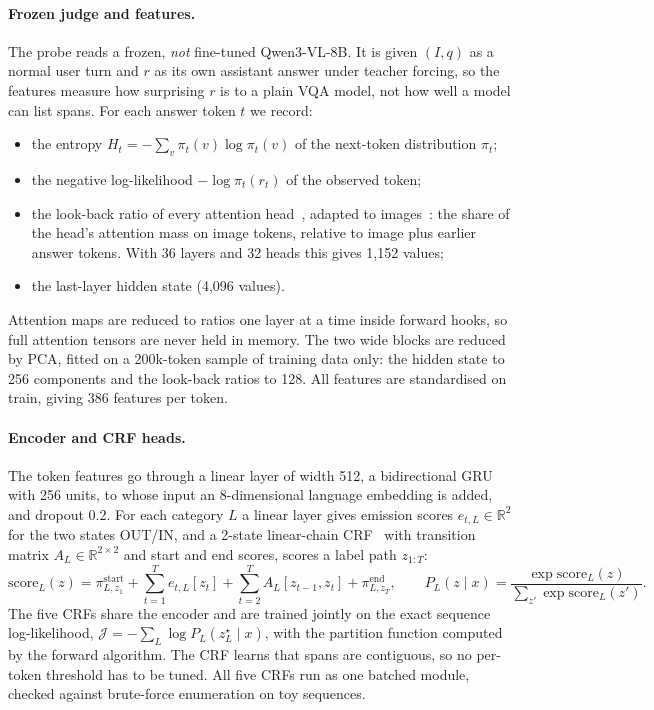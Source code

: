 \paragraph{Frozen judge and features.}
The probe reads a frozen, \emph{not} fine-tuned Qwen3-VL-8B. It is given $(I, q)$ as a normal user turn and $r$ as its own assistant answer under teacher forcing, so the features measure how surprising $r$ is to a plain VQA model, not how well a model can list spans. For each answer token $t$ we record:
\begin{itemize}
    \item the entropy $H_t = -\sum_v \pi_t(v) \log \pi_t(v)$ of the next-token distribution $\pi_t$;
    \item the negative log-likelihood $-\log \pi_t(r_t)$ of the observed token;
    \item the look-back ratio of every attention head~\cite{chuang2024lookback}, adapted to images~\cite{huang2024opera}: the share of the head's attention mass on image tokens, relative to image plus earlier answer tokens. With 36 layers and 32 heads this gives 1,152 values;
    \item the last-layer hidden state (4,096 values).
\end{itemize}
Attention maps are reduced to ratios one layer at a time inside forward hooks, so full attention tensors are never held in memory. The two wide blocks are reduced by PCA, fitted on a 200k-token sample of training data only: the hidden state to 256 components and the look-back ratios to 128. All features are standardised on train, giving 386 features per token.

\paragraph{Encoder and CRF heads.}
The token features go through a linear layer of width 512, a bidirectional GRU~\cite{cho2014gru} with 256 units, to whose input an 8-dimensional language embedding is added, and dropout 0.2. For each category $L$ a linear layer gives emission scores $e_{t,L} \in \mathbb{R}^2$ for the two states \textsf{OUT}/\textsf{IN}, and a 2-state linear-chain CRF~\cite{lafferty2001crf} with transition matrix $A_L \in \mathbb{R}^{2 \times 2}$ and start and end scores, scores a label path $z_{1:T}$:
\begin{equation}
    \mathrm{score}_L(z) = \pi^{\mathrm{start}}_{L, z_1} + \sum_{t=1}^{T} e_{t,L}[z_t] + \sum_{t=2}^{T} A_L[z_{t-1}, z_t] + \pi^{\mathrm{end}}_{L, z_T},
    \qquad
    P_L(z \mid x) = \frac{\exp \mathrm{score}_L(z)}{\sum_{z'} \exp \mathrm{score}_L(z')}.
\end{equation}
The five CRFs share the encoder and are trained jointly on the exact sequence log-likelihood, $\mathcal{J} = -\sum_L \log P_L(z^\star_L \mid x)$, with the partition function computed by the forward algorithm. The CRF learns that spans are contiguous, so no per-token threshold has to be tuned. All five CRFs run as one batched module, checked against brute-force enumeration on toy sequences.

